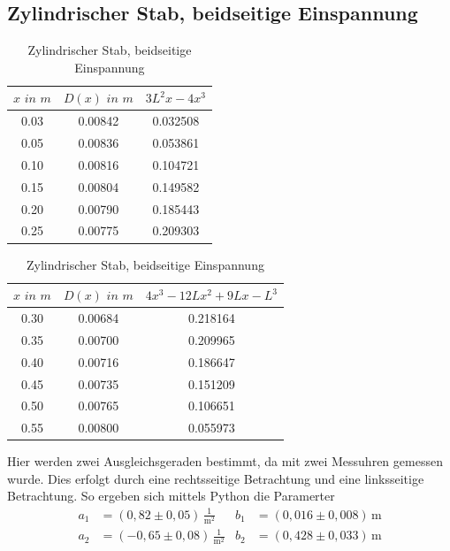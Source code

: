 \subsection{Zylindrischer Stab, beidseitige Einspannung}
\begin{table}
  \centering
  \caption{Zylindrischer Stab, beidseitige Einspannung}
  \label{tab:data2}
  \begin{tabular}{c c c  }
    \toprule $x \, \,  in \,\, m$ & $D(x) \,\, in \,\,  m$ & $3L^2x-4x^3$ \\
    \midrule
    0.03 & 0.00842 & 0.032508\\
    0.05 & 0.00836 & 0.053861\\
    0.10 & 0.00816 & 0.104721\\
    0.15 & 0.00804 & 0.149582\\
    0.20 & 0.00790 & 0.185443\\
    0.25 & 0.00775 & 0.209303\\
    \bottomrule
  \end{tabular}
\end{table}
\begin{table}
  \centering
  \caption{Zylindrischer Stab, beidseitige Einspannung}
  \label{tab:data2}
  \begin{tabular}{c c c  }
    \toprule $x \, \,  in \,\, m$ & $D(x) \,\, in \,\,  m$ & $4x^3-12Lx^2+9Lx-L^3$ \\
    \midrule
    0.30 & 0.00684 & 0.218164\\
    0.35 & 0.00700 & 0.209965\\
    0.40 & 0.00716 & 0.186647\\
    0.45 & 0.00735 & 0.151209\\
    0.50 & 0.00765 & 0.106651\\
    0.55 & 0.00800 & 0.055973\\
    \bottomrule
  \end{tabular}
\end{table}
Hier werden zwei Ausgleichsgeraden bestimmt, da mit zwei Messuhren gemessen wurde.
Dies erfolgt durch eine rechtsseitige Betrachtung und eine linksseitige Betrachtung.
So ergeben sich mittels Python die Paramerter
\begin{align*}
  a_1 &= (0,82 \pm 0,05) \, \mathrm{\frac{1}{m^2}} & b_1 &= (0,016 \pm 0,008) \, \mathrm{m} \\
  a_2 &= (-0,65 \pm 0,08) \, \mathrm{\frac{1}{m^2}} & b_2 &= (0,428 \pm 0,033) \, \mathrm{m}
\end{align*}
